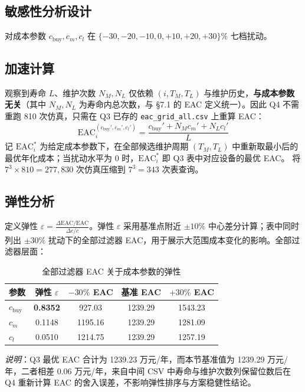 \documentclass[12pt, a4paper, fontset=fandol]{ctexart}
\theoremstyle{definition}
\begin{document}
\subsection{敏感性分析设计}

对成本参数 $c_{\text{buy}}, c_m, c_l$ 在 $\{-30, -20, -10, 0, +10, +20, +30\}\%$ 七档扰动。

\subsection{加速计算}

观察到寿命 $L$、维护次数 $N_M, N_L$ 仅依赖 $(i, T_M, T_L)$ 与维护历史，\textbf{与成本参数无关}（其中 $N_M, N_L$ 为寿命内总次数，与 §7.1 的 EAC 定义统一）。因此 Q4 不需重跑 810 次仿真，只需在 Q3 已存的 \texttt{eac\_grid\_all.csv} 上重算 EAC：
\[
\mathrm{EAC}_i^{(c_{\text{buy}}', c_m', c_l')} = \frac{c_{\text{buy}}' + N_M c_m' + N_L c_l'}{L}
\]
记 $\mathrm{EAC}_i^*$ 为给定成本参数下，在全部候选维护周期 $(T_M,T_L)$ 中重新取最小后的最优年化成本；当扰动水平为 $0$ 时，$\mathrm{EAC}_i^*$ 即 Q3 表中对应设备的最优 EAC。
将 $7^3 \times 810 = 277{,}830$ 次仿真压缩到 $7^3 = 343$ 次表查询。

\subsection{弹性分析}

定义弹性 $\varepsilon = \frac{\Delta \mathrm{EAC} / \mathrm{EAC}}{\Delta c / c}$。弹性 $\varepsilon$ 采用基准点附近 $\pm 10\%$ 中心差分计算；表中同时列出 $\pm 30\%$ 扰动下的全部过滤器 EAC，用于展示大范围成本变化的影响。全部过滤器层面：

\begin{table}[H]
\centering
\caption{全部过滤器 EAC 关于成本参数的弹性}
\begin{tabular}{lcccc}
\toprule
参数 & 弹性 $\varepsilon$ & $-30\%$ EAC & 基准 EAC & $+30\%$ EAC \\
\midrule
$c_{\text{buy}}$ & \textbf{0.8352} & 927.03 & 1239.29 & 1543.23 \\
$c_m$            & 0.1148 & 1195.16 & 1239.29 & 1281.09 \\
$c_l$            & 0.0510 & 1214.75 & 1239.29 & 1257.19 \\
\bottomrule
\end{tabular}
\end{table}

\noindent\textit{说明}：Q3 最优 EAC 合计为 1239.23 万元/年，而本节基准值为 1239.29 万元/年，二者相差 0.06 万元/年，来自中间 CSV 中寿命与维护次数列保留位数后在 Q4 重新计算 EAC 的舍入误差，不影响弹性排序与方案稳健性结论。
\end{document}
